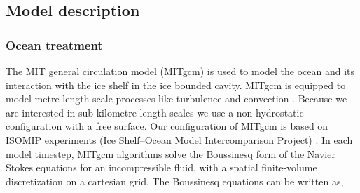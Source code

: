 \subsection{Model description}
\subsubsection{Ocean treatment} \label{sec:ocean_treatment}

The MIT general circulation model (MITgcm) \citep{marshall1997finite,marshall1997hydrostatic} is used to model the ocean and its interaction with the ice shelf in the ice bounded cavity. MITgcm is equipped to model metre length scale processes like turbulence and convection \citep[e.g.]{xu2012numerical}.
Because we are interested in sub-kilometre length scales we use a non-hydrostatic configuration with a free surface. Our configuration of MITgcm is based on ISOMIP experiments (Ice Shelf–Ocean Model Intercomparison Project) \citep{holland2003ice}.  In each model timestep, MITgcm algorithms solve the Boussinesq form of the Navier Stokes equations for an incompressible fluid, with a spatial finite-volume discretization on a cartesian grid.
The Boussinesq equations can be written as,


